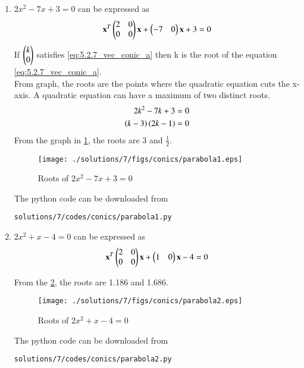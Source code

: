 
\begin{enumerate}

\item 
$2x^2 - 7x + 3 = 0$ can be expressed as 
\begin{align}
\label{eq:5.2.7_vec_conic_a}
\mathbf{x}^T \begin{pmatrix}2 & 0\\0 & 0\end{pmatrix}\mathbf{x}+ \begin{pmatrix}-7 & 0\end{pmatrix}\mathbf{x}+3=0
\end{align}
If $\begin{pmatrix}k\\0\end{pmatrix}$ satisfies \eqref{eq:5.2.7_vec_conic_a} then k is the root of the equation \eqref{eq:5.2.7_vec_conic_a}. \\
From graph, the roots are the points where the quadratic equation cuts the x-axis. A quadratic equation can have a maximum of two distinct roots.
\begin{align}
2k^{2}-7k+3 &= 0 \\
\left(k-3\right)\left(2k-1\right) &= 0
\end{align}
From the graph in \ref{fig:5.2.7_par1}, the roots are 3 and $\frac{1}{2}$. 
\begin{figure}[!ht]
\centering
\texttt{[image: ./solutions/7/figs/conics/parabola1.eps]}
\caption{Roots of $2x^2 - 7x + 3 = 0$}
\label{fig:5.2.7_par1}
\end{figure}
The python code can be downloaded from
\begin{lstlisting}
solutions/7/codes/conics/parabola1.py
\end{lstlisting}

\item 
$2x^2 + x -4 = 0$ can be expressed as 
\begin{align}
\label{eq:5.2.7_vec_conic_b}
\mathbf{x}^T \begin{pmatrix}2 & 0\\0 & 0\end{pmatrix}\mathbf{x}+ \begin{pmatrix}1 & 0\end{pmatrix}\mathbf{x} -4=0
\end{align}

From the \ref{fig:5.2.7_fig2}, the roots are 1.186 and 1.686.
\begin{figure}[!ht]
\centering
\texttt{[image: ./solutions/7/figs/conics/parabola2.eps]}
\caption{Roots of $2x^2 + x -4 = 0$ }
\label{fig:5.2.7_fig2}
\end{figure}
The python code can be downloaded from
\begin{lstlisting}
solutions/7/codes/conics/parabola2.py
\end{lstlisting}


\end{enumerate}
